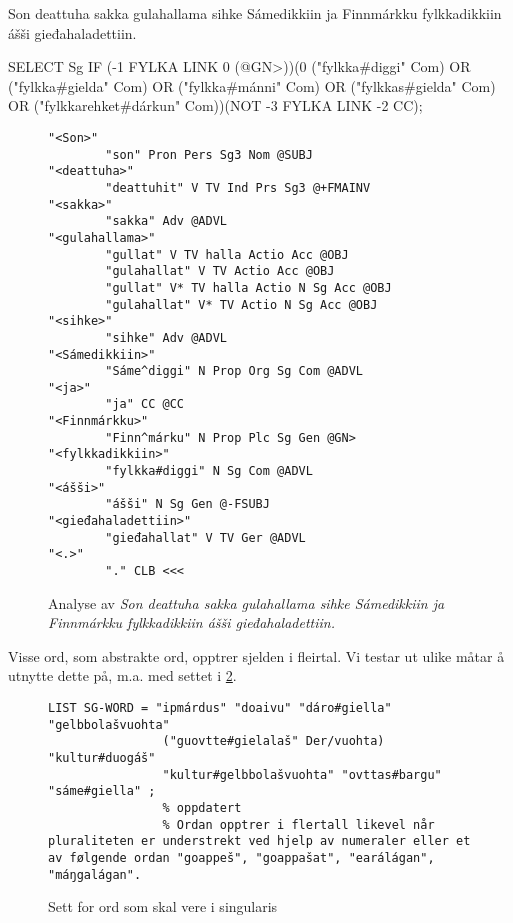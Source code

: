 \documentclass[a4paper,nynorsk]{article}
\begin{document}
\begin{example}\label{fylke}
Son deattuha sakka gulahallama sihke Sámedikkiin ja Finnmárkku fylkkadikkiin ášši gieđahaladettiin.
\end{example}

\begin{example}\label{fylkeregel}
SELECT Sg IF (-1 FYLKA LINK 0 (@GN>))(0 ("fylkka\#diggi" Com) OR ("fylkka\#gielda" Com) OR ("fylkka\#mánni" Com) OR ("fylkkas\#gielda" Com) OR ("fylkkarehket\#dárkun" Com))(NOT -3 FYLKA LINK -2 CC);
\end{example}

\begin{figure}[htbp]
\begin{center}
\begin{verbatim}
"<Son>"
        "son" Pron Pers Sg3 Nom @SUBJ
"<deattuha>"
        "deattuhit" V TV Ind Prs Sg3 @+FMAINV
"<sakka>"
        "sakka" Adv @ADVL
"<gulahallama>"
        "gullat" V TV halla Actio Acc @OBJ
        "gulahallat" V TV Actio Acc @OBJ
        "gullat" V* TV halla Actio N Sg Acc @OBJ
        "gulahallat" V* TV Actio N Sg Acc @OBJ
"<sihke>"
        "sihke" Adv @ADVL
"<Sámedikkiin>"
        "Sáme^diggi" N Prop Org Sg Com @ADVL
"<ja>"
        "ja" CC @CC
"<Finnmárkku>"
        "Finn^márku" N Prop Plc Sg Gen @GN>
"<fylkkadikkiin>"
        "fylkka#diggi" N Sg Com @ADVL
"<ášši>"
        "ášši" N Sg Gen @-FSUBJ
"<gieđahaladettiin>"
        "gieđahallat" V TV Ger @ADVL
"<.>"
        "." CLB <<<
\end{verbatim}

\caption{Analyse av \emph{Son deattuha sakka gulahallama sihke Sámedikkiin ja Finnmárkku fylkkadikkiin ášši gieđahaladettiin.}}
\label{fylkeanalyse}
\end{center}
\end{figure}

Visse ord, som abstrakte ord, opptrer sjelden i fleirtal. Vi testar ut ulike måtar å utnytte dette på, m.a. med settet i \ref{sgwds}. %


\begin{figure}[htbp]
\begin{center}
\begin{verbatim}
LIST SG-WORD = "ipmárdus" "doaivu" "dáro#giella" "gelbbolašvuohta"
 				("guovtte#gielalaš" Der/vuohta) "kultur#duogáš" 
 				"kultur#gelbbolašvuohta" "ovttas#bargu" "sáme#giella" ;
 				% oppdatert
 				% Ordan opptrer i flertall likevel når pluraliteten er understrekt ved hjelp av numeraler eller et av følgende ordan "goappeš", "goappašat", "earálágan", "máŋgalágan".
\end{verbatim}
\caption{Sett for ord som skal vere i singularis}
\label{sgwds}
\end{center}
\end{figure}
\end{document}
